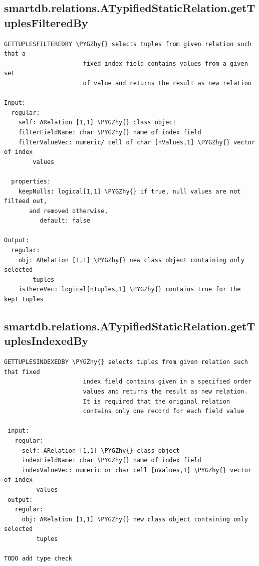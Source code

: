 \documentclass[letterpaper,10pt,english]{sphinxmanual}
\def\PYGZhy{\char`\-}
\begin{document}
\subsection{smartdb.relations.ATypifiedStaticRelation.getTuplesFilteredBy}
\label{chap_functions:smartdb-relations-atypifiedstaticrelation-gettuplesfilteredby}
\begin{Verbatim}[commandchars=\\\{\}]
GETTUPLESFILTEREDBY \PYGZhy{} selects tuples from given relation such that a
                      fixed index field contains values from a given set
                      of value and returns the result as new relation

Input:
  regular:
    self: ARelation [1,1] \PYGZhy{} class object
    filterFieldName: char \PYGZhy{} name of index field
    filterValueVec: numeric/ cell of char [nValues,1] \PYGZhy{} vector of index
        values

  properties:
    keepNulls: logical[1,1] \PYGZhy{} if true, null values are not filteed out,
       and removed otherwise,
          default: false

Output:
  regular:
    obj: ARelation [1,1] \PYGZhy{} new class object containing only selected
        tuples
    isThereVec: logical[nTuples,1] \PYGZhy{} contains true for the kept tuples
\end{Verbatim}


\subsection{smartdb.relations.ATypifiedStaticRelation.getTuplesIndexedBy}
\label{chap_functions:smartdb-relations-atypifiedstaticrelation-gettuplesindexedby}
\begin{Verbatim}[commandchars=\\\{\}]
 GETTUPLESINDEXEDBY \PYGZhy{} selects tuples from given relation such that fixed
                      index field contains given in a specified order
                      values and returns the result as new relation.
                      It is required that the original relation
                      contains only one record for each field value

 input:
   regular:
     self: ARelation [1,1] \PYGZhy{} class object
     indexFieldName: char \PYGZhy{} name of index field
     indexValueVec: numeric or char cell [nValues,1] \PYGZhy{} vector of index
         values
 output:
   regular:
     obj: ARelation [1,1] \PYGZhy{} new class object containing only selected
         tuples

TODO add type check
\end{Verbatim}
\end{document}
